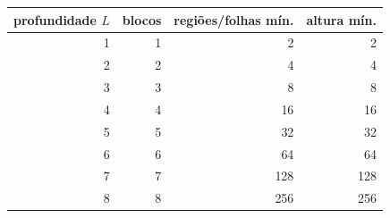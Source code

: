 \begin{tabular}{rrrr}
\toprule
profundidade $L$ & blocos & regiões/folhas mín. & altura mín.\\
\midrule
1 & 1 & 2 & 2\\
2 & 2 & 4 & 4\\
3 & 3 & 8 & 8\\
4 & 4 & 16 & 16\\
5 & 5 & 32 & 32\\
6 & 6 & 64 & 64\\
7 & 7 & 128 & 128\\
8 & 8 & 256 & 256\\
\bottomrule
\end{tabular}
